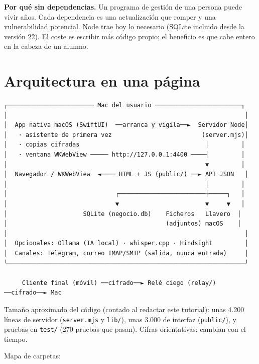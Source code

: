 \textbf{Por qué sin dependencias.} Un programa de gestión de una persona puede vivir años. Cada dependencia es una actualización que romper y una vulnerabilidad potencial. Node trae hoy lo necesario (SQLite incluido desde la versión 22). El coste es escribir más código propio; el beneficio es que cabe entero en la cabeza de un alumno.

\chapter{Arquitectura en una página}\label{arquitectura-en-una-puxe1gina}

\begin{verbatim}
┌──────────────────────── Mac del usuario ────────────────────────┐
│                                                                  │
│  App nativa macOS (SwiftUI)  ──arranca y vigila──►  Servidor Node│
│   · asistente de primera vez                         (server.mjs)│
│   · copias cifradas                                   │         │
│   · ventana WKWebView ───── http://127.0.0.1:4400 ────┤         │
│                                                       ▼         │
│  Navegador / WKWebView  ◄──── HTML + JS (public/) ──► API JSON   │
│                                                       │         │
│                              ┌────────────────────────┼─────┐   │
│                              ▼                        ▼     ▼   │
│                     SQLite (negocio.db)    Ficheros   Llavero  │
│                                            (adjuntos) macOS    │
│                                                                  │
│  Opcionales: Ollama (IA local) · whisper.cpp · Hindsight         │
│  Canales: Telegram, correo IMAP/SMTP (salida, nunca entrada)     │
└──────────────────────────────────────────────────────────────────┘

     Cliente final (móvil) ──cifrado──► Relé ciego (relay/) ──cifrado──► Mac
\end{verbatim}

Tamaño aproximado del código (contado al redactar este tutorial): unas 4.200 líneas de servidor (\texttt{server.mjs} y \texttt{lib/}), unas 3.000 de interfaz (\texttt{public/}), y pruebas en \texttt{test/} (270 pruebas que pasan). Cifras orientativas; cambian con el tiempo.

Mapa de carpetas:

